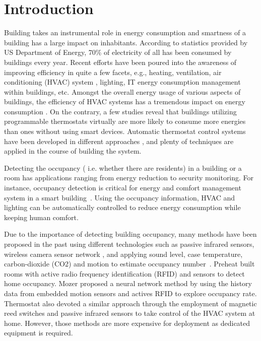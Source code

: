 \section{Introduction}
Building takes an instrumental role in energy consumption and
smartness of a building has a large impact on inhabitants. According
to statistics provided by US Department of Energy, 70\% of electricity
of all has been consumed by buildings every year. Recent efforts have
been poured into the awareness of improving efficiency in quite a few
facets, e.g., heating, ventilation, air conditioning (HVAC) system
\cite{10}\cite{12}, lighting\cite{8}, IT energy consumption management
within buildings\cite{1}\cite{2}, etc. Amongst the overall energy
usage of various aspects of buildings, the efficiency of HVAC systems
has a tremendous impact on energy consumption \cite{83}. On the
contrary, a few studies \cite{86} reveal that buildings utilizing
programmable thermostats virtually are more likely to consume more
energies than ones without using smart devices. Automatic thermostat
control systems have been developed in different approaches
\cite{87}\cite{88}, and plenty of techniques are applied in the course
of building the system.

Detecting the occupancy ( i.e. whether there are residents) in a
building or a room has applications ranging from energy reduction
to security monitoring.
For instance, occupancy detection is critical for energy and comfort management
system in a smart building~\cite{Nguyen:energy13}.
Using the occupancy information, HVAC and lighting can be
automatically controlled to reduce energy consumption while keeping
human comfort.

Due to the importance of detecting building occupancy, many methods
have been proposed in the past using different technologies such as
passive infrared sensors\cite{Dodier:energy06}, wireless camera sensor
network \cite{Kamthe:EWSN09}, and applying sound level, case
temperature, carbon-dioxide (CO2) and motion to estimate occupancy
number~\cite{Ekwevugbe:DEST13}.  Preheat \cite{8.10} built rooms with
active radio frequency identification (RFID) and sensors to detect
home occupancy. Mozer \cite{8.9} proposed a neural network method by
using the history data from embedded motion sensors and actives RFID
to explore occupancy rate. Thermostat \cite{8.11} also devoted a
similar approach through the employment of magnetic reed switches and
passive infrared sensors to take control of the HVAC system at
home. However, those methods are more expensive for deployment as
dedicated equipment is required.

